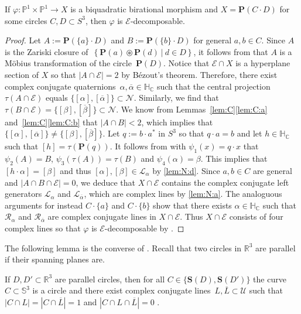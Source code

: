 \documentclass[11pt]{article}
\newcommand{\RL}[2]{\Cref{lem:#1}\ref{lem:#1:#2}}
\newcommand{\C}{\mathbb{C}}
\newcommand{\R}{\mathbb{R}}
\renewcommand{\P}{\mathbb{P}}
\renewcommand{\S}{\mathbb{S}}
\newcommand{\bP}{\mathbf{P}}
\newcommand{\bS}{\mathbf{S}}
\newcommand{\cN}{\mathcal{N}}
\newcommand{\cE}{\mathcal{E}}
\newcommand{\cL}{\mathcal{L}}
\newcommand{\cR}{\mathcal{R}}
\newcommand{\cU}{\mathcal{U}}
\newcommand{\oL}{{\overline{L}}}
\newcommand{\oalpha}{{\overline{\alpha}}}
\newcommand{\obeta}{{\overline{\beta}}}
\newcommand{\HC}{\mathbb{H}_{\C}}
\renewcommand{\c}{\colon}
\newcommand{\set}[2]{\left\{#1 ~|~ #2\right\}}
\newcommand{\st}{such that }
\begin{document}
\begin{proposition}
\label{prp:CDE}
If $\varphi\c\P^1\times\P^1\to X$ is a
biquadratic birational morphism and $X=\bP(C\cdot D)$
for some circles $C,D\subset S^3$,
then $\varphi$ is $\cE$-decomposable.
\end{proposition}

\begin{proof}
Let $A:=\bP(\{a\}\cdot D)$ and $B:=\bP(\{b\}\cdot D)$ for general $a,b\in C$.
Since $A$ is the Zariski closure of~$\set{\bP(a)\circledast\bP(d)}{d\in D}$,
it follows from  that $A$ is a M\"obius transformation of the circle~$\bP(D)$.
Notice that $\cE\cap X$ is a hyperplane section of $X$
so that $|A\cap\cE|=2$ by B\'ezout's theorem.
Therefore,
there exist complex conjugate quaternions~$\alpha,\oalpha\in\HC$
\st the central projection~$\tau(A\cap\cE)$ equals $\{[\alpha],[\oalpha]\}\subset\cN$.
Similarly, we find that $\tau(B\cap\cE)=\{[\beta],[\obeta]\}\subset\cN$.
We know from Lemmas~\ref{lem:C}\ref{lem:C:a} and~\ref{lem:C}\ref{lem:C:b} that $|A\cap B|<2$,
which implies that $\{[\alpha],[\oalpha]\}\neq\{[\beta],[\obeta]\}$.
Let $q:=b\cdot a^*$ in $S^3$ so that $q\cdot a=b$
and let $h\in\HC$ \st $[h]=\tau(\bP(q))$.
It follows from  with $\psi_1(x)=q\cdot x$
that $\psi_2(A)=B$, $\psi_3(\tau(A))=\tau(B)$ and $\psi_4(\alpha)=\beta$.
This implies that $[h\cdot\alpha]=[\beta]$
and thus $[\alpha],[\beta]\in\cL_\alpha$ by \RL{N}{d}.
Since $a,b\in C$ are general and $|A\cap B\cap\cE|=0$,
we deduce that $X\cap\cE$ contains the complex conjugate left generators
$\cL_\alpha$ and $\cL_\oalpha$, which are complex lines by \RL{N}{a}.
The analoguous arguments for instead $C\cdot\{a\}$ and $C\cdot\{b\}$
show that
there exists $\alpha\in\HC$ \st
$\cR_\alpha$ and $\cR_\oalpha$
are complex conjugate lines in $X\cap\cE$.
Thus $X\cap\cE$ consists of four complex lines
so that $\varphi$ is $\cE$-decomposable by .
\end{proof}

The following lemma is the converse of .
Recall that two circles in $\R^3$ are parallel if their spanning planes are.

\begin{lemma}
\label{lem:parLL}
If $D,D'\subset\R^3$ are parallel circles,
then
for all $C\in\{\bS(D),\bS(D')\}$
the curve
$C\subset\S^3$ is a circle
and
there exist complex conjugate lines~$L,\oL\subset\cU$
\st
$|C\cap L|=|C\cap\oL|=1$ and $|C\cap L\cap\oL|=0$
.
\end{lemma}
\end{document}

